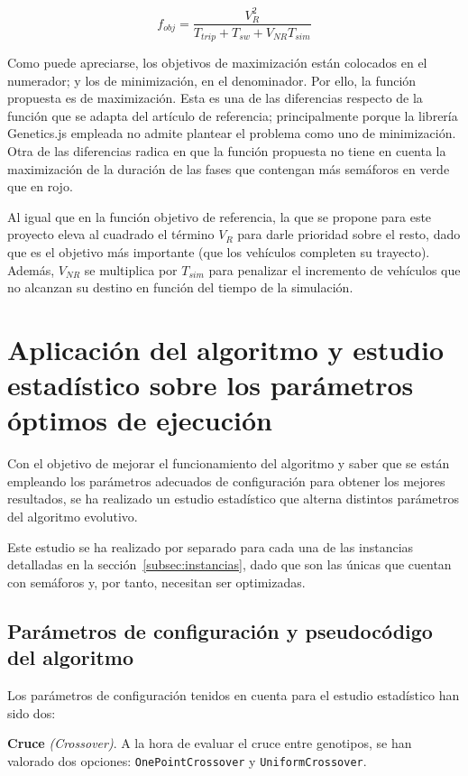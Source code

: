 $$
f_{obj} = \frac{V_R^2}{T_{trip} + T_{sw} + V_{NR} T_{sim}}
$$

Como puede apreciarse, los objetivos de maximización están colocados en el numerador; y los de minimización, en el denominador. Por ello, la función propuesta es de maximización. Esta es una de las diferencias respecto de la función que se adapta del artículo de referencia; principalmente porque la librería Genetics.js empleada no admite plantear el problema como uno de minimización. Otra de las diferencias radica en que la función propuesta no tiene en cuenta la maximización de la duración de las fases que contengan más semáforos en verde que en rojo.

Al igual que en la función objetivo de referencia, la que se propone para este proyecto eleva al cuadrado el término $V_R$ para darle prioridad sobre el resto, dado que es el objetivo más importante (que los vehículos completen su trayecto). Además, $V_{NR}$ se multiplica por $T_{sim}$ para penalizar el incremento de vehículos que no alcanzan su destino en función del tiempo de la simulación.

\section{Aplicación del algoritmo y estudio estadístico sobre los parámetros óptimos de ejecución}

Con el objetivo de mejorar el funcionamiento del algoritmo y saber que se están empleando los parámetros adecuados de configuración para obtener los mejores resultados, se ha realizado un estudio estadístico que alterna distintos parámetros del algoritmo evolutivo.

Este estudio se ha realizado por separado para cada una de las instancias detalladas en la sección~\ref{subsec:instancias}, dado que son las únicas que cuentan con semáforos y, por tanto, necesitan ser optimizadas.

\subsection{Parámetros de configuración y pseudocódigo del algoritmo}
\label{subsec:parametros}

Los parámetros de configuración tenidos en cuenta para el estudio estadístico han sido dos:

\textbf{Cruce} \textit{(Crossover)}. A la hora de evaluar el cruce entre genotipos, se han valorado dos opciones: \texttt{OnePointCrossover} y \texttt{UniformCrossover}.

